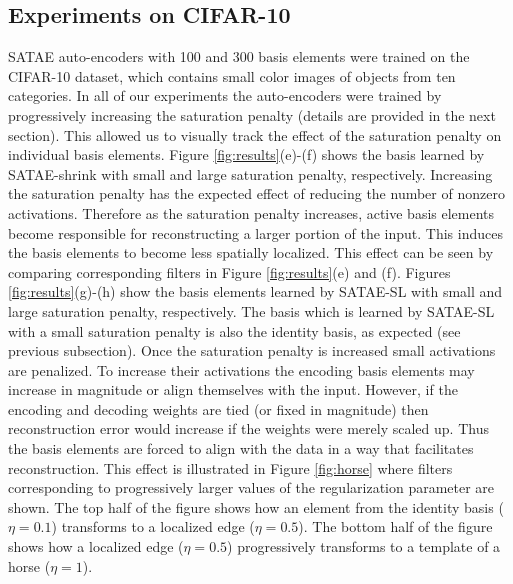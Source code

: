 \documentclass{article} %
\begin{document}
\subsection{Experiments on CIFAR-10}
SATAE auto-encoders with 100 and 300 basis elements were trained on the CIFAR-10 dataset, which contains small color images of objects from ten categories. In all of our experiments the auto-encoders were trained by progressively increasing the saturation penalty (details are provided in the next section). This allowed us to visually track the effect of the saturation penalty on individual basis elements. Figure \ref{fig:results}(e)-(f) shows the basis learned by SATAE-shrink with small and large saturation penalty, respectively. Increasing the saturation penalty has the expected effect of reducing the number of nonzero activations. Therefore as the saturation penalty increases, active basis elements become responsible for reconstructing a larger portion of the input. This induces the basis elements to become less spatially localized. This effect can be seen by comparing corresponding filters in Figure \ref{fig:results}(e) and (f). Figures \ref{fig:results}(g)-(h)  show the basis elements learned by SATAE-SL with small and large saturation penalty, respectively. The basis which is learned by SATAE-SL with a small saturation penalty is also the identity basis, as expected (see previous subsection). Once the saturation penalty is increased small activations are penalized. To increase their activations the encoding basis elements may increase in magnitude or align themselves with the input. However, if the encoding and decoding weights are tied (or fixed in magnitude) then reconstruction error would increase if the weights were merely scaled up. Thus the basis elements are forced to align with the data in a way that facilitates reconstruction. This effect is illustrated in Figure \ref{fig:horse} where filters corresponding to progressively larger values of the regularization parameter are shown. The top half of the figure shows how an element from the identity basis ($\eta=0.1$) transforms to a localized edge ($\eta=0.5$). The bottom half of the figure shows how a localized edge ($\eta=0.5$) progressively transforms to a template of a horse ($\eta=1$). 
\end{document}
